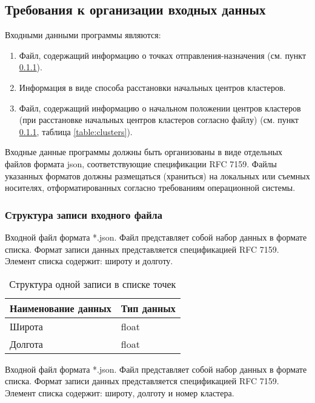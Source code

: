 \subsection{Требования к организации входных данных}\label{input-files}
Входными данными программы являются:
\begin{enumerate}
    \item Файл, содержащий информацию о точках отправления-назначения (см. пункт 
        \ref{file-format}).
    \item Информация в виде способа расстановки начальных центров кластеров.
    \item Файл, содержащий информацию о начальном положении центров кластеров (при расстановке начальных центров кластеров согласно файлу) (см. пункт 
        \ref{file-format}, таблица \ref{table:clusters}).
\end{enumerate}

Входные данные программы должны быть организованы в виде отдельных файлов формата json, соответствующие спецификации 
RFC 7159. Файлы указанных форматов должны размещаться (храниться) на локальных или съемных носителях, отформатированных 
согласно требованиям операционной системы.

\subsubsection{Структура записи входного файла}\label{file-format}
Входной файл формата *.json. Файл представляет собой набор данных в формате списка. Формат записи данных представляется 
спецификацией RFC 7159. Элемент списка содержит: широту и долготу.

\begin{table}[ht!]
    \centering
    \caption{Структура одной записи в списке точек}
    \label{table:points}
    \begin{tabular}{|l|l|}
        \hline
        Наименование данных & Тип данных \\ \hline
        Широта              & float      \\ \hline
        Долгота             & float      \\ \hline
    \end{tabular}
\end{table}

Входной файл формата *.json. Файл представляет собой набор данных в формате списка. Формат записи данных представляется 
спецификацией RFC 7159. Элемент списка содержит: широту, долготу и номер кластера.

